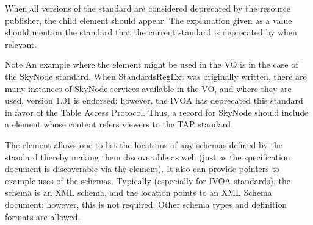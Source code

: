\documentclass[11pt,a4paper]{ivoa}
\begin{document}

When all versions of the standard are considered deprecated by the
resource publisher, the  child element
should appear.  The explanation given as a value should mention the
standard that the current standard is deprecated by when relevant.

\begin{admonition}{Note}
An example where the  element
might be used in the VO is in the case of the SkyNode standard.
When StandardsRegExt was originally written, there are
many instances of SkyNode services available in the VO, and where
they are used, version 1.01 is endorsed; however, the IVOA has
deprecated this standard in favor of the Table Access
Protocol.  Thus, a
 record for
SkyNode should include a 
element whose content refers viewers to the TAP standard.
\end{admonition}

The  element allows one to
list the locations of any schemas defined by the standard thereby making
them discoverable as well (just as the specification document is
discoverable via the 
element).  It also can provide pointers to example uses of the
schemas.  Typically (especially for IVOA standards), the schema is an
XML schema, and the location points to an XML Schema document; however, this is not required.
Other schema types and definition formats are allowed.
\end{document}
